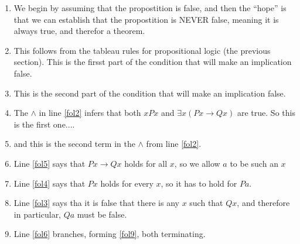 \begin{problem}
\begin{minipage}{0.5\textwidth}
\color{black}
\fi

\end{minipage}\hfill
\begin{minipage}{0.4\textwidth}
\begin{enumerate}
\item  \label{fol1}
\vspace{1em}
\ifKey
\color{red} We begin by assuming that the propostition is false, and then the ``hope'' is that we can establish that the propostition is NEVER false, meaning it is always true, and therefor a theorem.
\color{black}
\else
{} 
\fi

\item  \label{fol2}
\vspace{1em}
\ifKey
\color{red} This follows from the tableau rules for propositional logic (the previous section).  This is the firsst part of the condition that will make an implication false.
\color{black}
\else
{} 
\fi


\item \label{fol3}
\vspace{1em}
\ifKey
\color{red}  This is the second part of the condition that will make an implication false.
\color{black}
\else
{} 
\fi


\item \label{fol4}
\vspace{1em}
\ifKey
\color{red} The $\land$ in line \ref{fol2} infers that both $xPx$ and $\exists x(Px\rightarrow Qx)$ are true. So this is the first one....
\color{black}
\else
{} 
\fi

\item \label{fol5}
\vspace{1em}
\ifKey
\color{red}and this is the second term in the  $\land$ from line \ref{fol2}. 
\color{black}
\else
{} 
\fi


\item \label{fol6}
\vspace{1em}
\ifKey
\color{red} Line \ref{fol5} says that $Px\rightarrow Qx$ holds for all $x$, so we allow $a$ to be such an $x$
\color{black}
\else
{} 
\fi

\item \label{fol7}
\vspace{1em}
\ifKey
\color{red} Line \ref{fol4} says that $Px$ holds for every $x$, so it has to hold for $Pa$.
\color{black}
\else
{} 
\fi

\item \label{fol8}
\vspace{1em}
\ifKey
\color{red} Line \ref{fol3} says tha it is false that there is any $x$ such that $Qx$, and therefore in particular, $Qa$ must be false.
\color{black}
\else
{} 
\fi

\item \label{fol9}
\vspace{1em}
\ifKey
\color{red} Line \ref{fol6} branches, forming \ref{fol9}, both terminating.
\color{black}
\else
{} 
\fi

\end{enumerate}
\end{minipage}
\end{problem}
